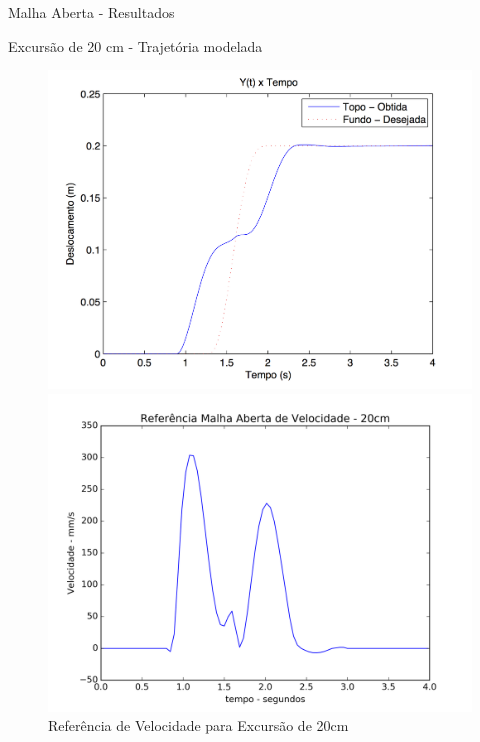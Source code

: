 \documentclass[10pt]{beamer}
\begin{document}
\begin{frame}[fragile]{Malha Aberta - Resultados}
\begin{block}{Excursão de 20 cm - Trajetória modelada}

\begin{figure}[!htb]
    \centering
    \begin{minipage}{.45\textwidth}
        \centering
        \includegraphics[width=1\linewidth]{figures/resultados/malha_aberta_2/DeslocamentoT2}
        \caption{Referência de Posição para Excursão de 20cm}
        \label{DeslocamentoT2}
    \end{minipage}%
    \hspace{0.1cm}
    \begin{minipage}{0.45\textwidth}
        \centering
        \includegraphics[width=1\linewidth]{figures/resultados/malha_aberta_2/VelocidadeT2}
        \caption{Referência de Velocidade para Excursão de 20cm}
        \label{VelocidadeT2}
    \end{minipage}
\end{figure}

\end{block}
\end{frame}
\end{document}
